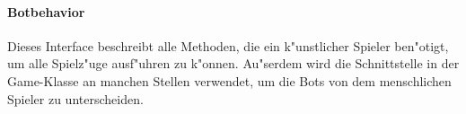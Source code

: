\paragraph{Botbehavior}
\label{par:botbehavior}
Dieses Interface beschreibt alle Methoden, die ein k"unstlicher Spieler ben"otigt, um alle Spielz"uge ausf"uhren zu k"onnen. Au"serdem wird die Schnittstelle in der Game-Klasse an manchen Stellen verwendet, um die Bots von dem menschlichen Spieler zu unterscheiden. 